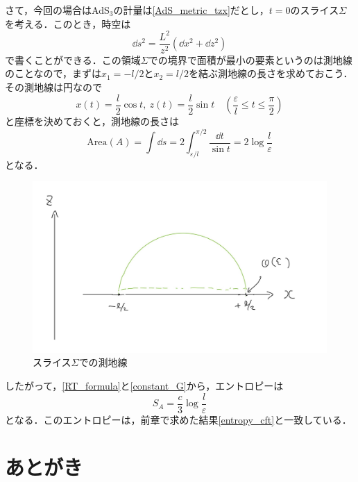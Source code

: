 \documentclass[a4paper,uplatex,dvipdfmx]{jsarticle}
\theoremstyle{definition}
\begin{document}
さて，今回の場合はAdS$_{3}$の計量は\eqref{AdS_metric_tzx}だとし，$t=0$のスライス$\Sigma$を考える．このとき，時空は
\begin{equation}
  \dd s^2
  =
  \frac{L^2}{z^2}(\dd x^2+\dd z^2)
\end{equation}
で書くことができる．この領域$\Sigma$での境界で面積が最小の要素というのは測地線のことなので，まずは$x_1=-l/2$と$x_2=l/2$を結ぶ測地線の長さを求めておこう．その測地線は円なので
\begin{equation}
  x(t)
  =
  \frac{l}{2}\cos t
  ,\ 
  z(t)
  =
  \frac{l}{2}\sin t
  \quad
  \left(  
    \frac{\varepsilon}{l}\leq t\leq\frac{\pi}{2}
  \right)
\end{equation}
と座標を決めておくと，測地線の長さは
\begin{equation}
  \text{Area}(A)
  =
  \int\dd s
  =
  2\int_{\varepsilon/l}^{\pi/2}
  \frac{\dd t}{\sin t}
  =
  2\log \frac{l}{\varepsilon}
\end{equation}
となる．

\begin{figure}[ht]
  \centering
  \includegraphics[keepaspectratio,width=0.8\linewidth]{fig/geodecies.jpg}
  \caption{スライス$\Sigma$での測地線}
\end{figure}

したがって，\eqref{RT_formula}と\eqref{constant_G}から，エントロピーは
\begin{equation}
  S_{A}
  =
  \frac{c}{3}\log \frac{l}{\varepsilon}
\end{equation}
となる．このエントロピーは，前章で求めた結果\eqref{entropy_cft}と一致している．


\section{あとがき}
\end{document}
